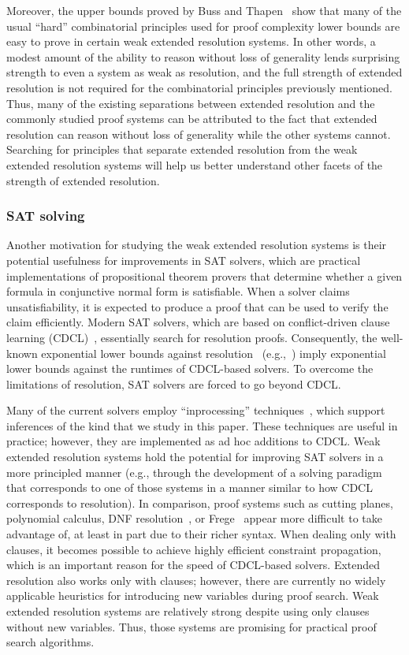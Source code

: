 \documentclass[12pt]{article}
\begin{document}
Moreover, the upper bounds proved by Buss and Thapen~\cite{BT21}
show that many of the usual ``hard'' combinatorial principles
used for proof complexity lower bounds are easy to prove
in certain weak extended resolution systems.
In other words, a modest amount of the ability to reason without loss of generality
lends surprising strength to even a system as weak as resolution,
and the full strength of extended resolution
is not required for the combinatorial principles previously mentioned.
Thus, many of the existing separations between extended resolution
and the commonly studied proof systems can be attributed to the fact
that extended resolution can reason without loss of generality
while the other systems cannot.
Searching for principles that separate extended resolution
from the weak extended resolution systems will help us
better understand other facets of the strength of extended resolution.

\subsubsection{SAT solving}
\label{sec:SAT-solving}

Another motivation for studying the weak extended resolution systems
is their potential usefulness for improvements in SAT solvers,
which are practical implementations of propositional theorem provers
that determine whether a given formula in conjunctive normal form is satisfiable.
When a solver claims unsatisfiability, it is expected to produce a proof
that can be used to verify the claim efficiently.
Modern SAT solvers, which are based on
conflict-driven clause learning (CDCL)~\cite{MS99},
essentially search for resolution proofs.
Consequently, the well-known exponential lower bounds against resolution~%
(e.g.,~\cite{Hak85,Urq87}) imply exponential lower bounds against
the runtimes of CDCL-based solvers.
To overcome the limitations of resolution,
SAT solvers are forced to go beyond CDCL\@.

Many of the current solvers employ ``inprocessing'' techniques~\cite{JHB12},
which support inferences of the kind that we study in this paper.
These techniques are useful in practice;
however, they are implemented as ad hoc additions to CDCL\@.
Weak extended resolution systems hold the potential
for improving SAT solvers in a more principled manner
(e.g., through the development of a solving paradigm
that corresponds to one of those systems
in a manner similar to how CDCL corresponds to resolution).
In comparison, proof systems such as cutting planes, polynomial calculus,
DNF resolution~\cite{Kra01}, or Frege~\cite{CR79}
appear more difficult to take advantage of,
at least in part due to their richer syntax.
When dealing only with clauses, it becomes possible to
achieve highly efficient constraint propagation,
which is an important reason for the speed of CDCL-based solvers.
Extended resolution also works only with clauses;
however, there are currently no widely applicable heuristics
for introducing new variables during proof search.
Weak extended resolution systems are relatively strong
despite using only clauses without new variables.
Thus, those systems are promising for practical proof search algorithms.
\end{document}

